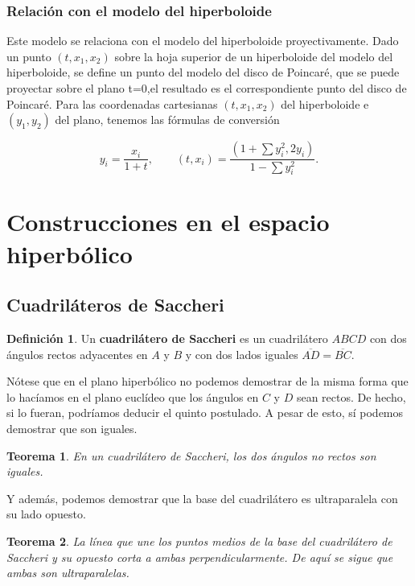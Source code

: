 \documentclass{article}
\theoremstyle{plain}
\newtheorem{theorem}{Teorema}
\theoremstyle{definition}
\newtheorem{definition}{Definición}
\theoremstyle{remark}
\begin{document}
\subsubsection{Relación con el modelo del hiperboloide}
Este modelo se relaciona con el modelo del hiperboloide
proyectivamente. Dado un punto $(t, x_1,x_2)$ sobre la hoja superior
de un hiperboloide del modelo del hiperboloide, se define un punto del
modelo del disco de Poincaré, que se puede proyectar sobre el plano
t=0,el resultado es el correspondiente punto del disco de Poincaré.
Para las coordenadas cartesianas $(t,x_1,x_2)$ del hiperboloide e
$(y_1,y_2)$ del plano, tenemos las fórmulas de conversión

\[
  y_{i}=\frac {x_{i}}{1+t},
  \qquad
  (t,x_{i})=\frac {(1+\sum {y_{i}^{2}},2y_{i})}{1-\sum {y_{i}^{2}}}.
\]


\section{Construcciones en el espacio hiperbólico}
\subsection{Cuadriláteros de Saccheri}
\begin{definition}
  Un \textbf{cuadrilátero de Saccheri} es un cuadrilátero $ABCD$ con
  dos ángulos rectos adyacentes en $A$ y $B$ y con dos lados iguales
  $\overline{AD} = \overline{BC}$.
\end{definition}

Nótese que en el plano hiperbólico no podemos demostrar de la misma
forma que lo hacíamos en el plano euclídeo que los ángulos en $C$ y
$D$ sean rectos. De hecho, si lo fueran, podríamos deducir el quinto
postulado. A pesar de esto, sí podemos demostrar que son iguales.

\begin{theorem}
  En un cuadrilátero de Saccheri, los dos ángulos no rectos son
  iguales.
\end{theorem}

Y además, podemos demostrar que la base del cuadrilátero es ultraparalela
con su lado opuesto.

\begin{theorem}
  La línea que une los puntos medios de la base del cuadrilátero de
  Saccheri y su opuesto corta a ambas perpendicularmente. De aquí se
  sigue que ambas son ultraparalelas.
\end{theorem}
\end{document}
